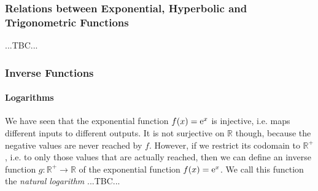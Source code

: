 






\subsubsection{Relations between Exponential, Hyperbolic and Trigonometric Functions}

...TBC...





\subsubsection{Inverse Functions}

\paragraph{Logarithms}
We have seen that the exponential function $f(x) = \operatorname{\mathrm{e}}^x$ is injective, i.e. maps different inputs to different outputs. It is not surjective on $\mathbb{R}$ though, because the negative values are never reached by $f$. However, if we restrict its codomain to $\mathbb{R}^+$, i.e. to only those values that are actually reached, then we can define an inverse function $g: \mathbb{R}^+ \rightarrow \mathbb{R}$ of the exponential function $f(x) = \operatorname{\mathrm{e}}^x$. We call this function the \emph{natural logarithm} ...TBC...



